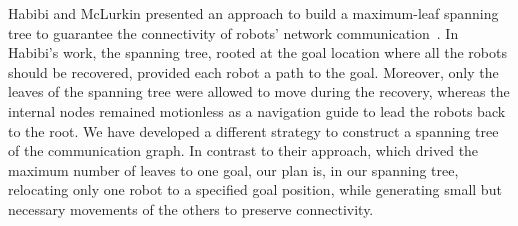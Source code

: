 Habibi and McLurkin presented an approach to build a maximum-leaf
spanning tree to guarantee the connectivity of robots' network
communication~\cite{HabMcL14}.
%
In Habibi's work, the spanning tree, rooted at the goal location where
all the robots should be recovered, provided each robot a path to the
goal. 
%
Moreover, only the leaves of the spanning tree were allowed to move during
the recovery, whereas the internal nodes remained motionless as a
navigation guide to lead the robots back to the root.
%
We have developed a different strategy to construct a spanning tree of the communication
graph. 
%
In contrast to their approach, which drived the maximum number of leaves to
one goal, our plan is, in our spanning tree, 
relocating only one robot to a specified goal position, 
while generating small but
necessary movements of the others to preserve connectivity.



